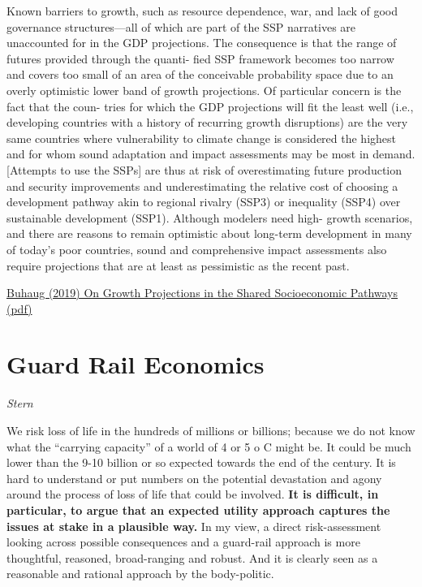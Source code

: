 \documentclass[
]{book}
\begin{document}
Known barriers to growth, such as resource dependence, war, and lack
of good governance structures---all of which are part of the SSP narratives
are unaccounted for in the GDP projections.
The consequence is that the range of futures provided through the quanti-
ﬁed SSP framework becomes too narrow
and covers too
small of an area of the conceivable probability space due to an overly optimistic
lower band of growth projections. Of particular concern is the fact that the coun-
tries for which the GDP projections will ﬁt the least well (i.e., developing countries
with a history of recurring growth disruptions) are the very same countries where
vulnerability to climate change is considered the highest and for whom sound
adaptation and impact assessments may be most in demand.
{[}Attempts to use the SSPs{]} are thus at risk of overestimating future production and security
improvements and underestimating the relative cost of
choosing a development pathway akin to regional rivalry (SSP3) or inequality
(SSP4) over sustainable development (SSP1). Although modelers need high-
growth scenarios, and there are reasons to remain optimistic about long-term
development in many of today's poor countries, sound and comprehensive
impact assessments also require projections that are at least as pessimistic as
the recent past.

\href{https://direct.mit.edu/glep/article/19/4/118/14961/On-Growth-Projections-in-the-Shared-Socioeconomic}{Buhaug (2019) On Growth Projections in the Shared Socioeconomic Pathways}
\href{pdf/Buhaug_2019_SSPs.pdf}{(pdf)}

\hypertarget{guard-rail-economics}{%
\section{Guard Rail Economics}\label{guard-rail-economics}}

\emph{Stern}

We risk loss of life in the hundreds of millions or billions; because we do not know what the ``carrying
capacity'' of a world of 4 or 5 o C might be. It could be much lower than the 9-10 billion or so expected
towards the end of the century. It is hard to understand or put numbers on the potential devastation and
agony around the process of loss of life that could be involved.
\textbf{It is difficult, in particular, to argue that
an expected utility approach captures the issues at stake in a plausible way.}
In my view, a direct risk-assessment looking across possible consequences
and a guard-rail approach is more thoughtful,
reasoned, broad-ranging and robust.
And it is clearly seen as a reasonable and rational approach by
the body-politic.
\end{document}
